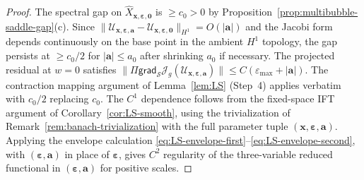 \documentclass[11pt,reqno,a4paper]{amsart}
\numberwithin{equation}{section}
\theoremstyle{plain}
\theoremstyle{remark}
\theoremstyle{plain}
\begin{document}
\begin{proof}
The spectral gap on $\widehat X_{\mathbf x,\boldsymbol\varepsilon,\mathbf 0}$ is $\ge c_0>0$
by Proposition~\ref{prop:multibubble-saddle-gap}\textup{(c)}.
Since
$\|\mathcal U_{\mathbf x,\boldsymbol\varepsilon,\mathbf a}
-\mathcal U_{\mathbf x,\boldsymbol\varepsilon,\mathbf 0}\|_{H^1}
=O(|\mathbf a|)$
and the Jacobi form depends continuously on the base point in the ambient $H^1$ topology,
the gap persists at $\ge c_0/2$ for $|\mathbf a|\le a_0$ after shrinking $a_0$ if necessary.
The projected residual at $w=0$ satisfies
$\|\Pi\mathsf{grad}_{\mathcal S}\mathcal J_g
(\mathcal U_{\mathbf x,\boldsymbol\varepsilon,\mathbf a})\|
\le C(\varepsilon_{\max}+|\mathbf a|)$.
The contraction mapping argument of Lemma~\ref{lem:LS} (Step~4)
applies verbatim with $c_0/2$ replacing $c_0$.
The $C^1$ dependence follows from the fixed-space IFT argument of
Corollary~\ref{cor:LS-smooth}, using the trivialization of
Remark~\ref{rem:banach-trivialization} with the full parameter tuple
$(\mathbf x,\boldsymbol\varepsilon,\mathbf a)$.  Applying the envelope calculation
\eqref{eq:LS-envelope-first}--\eqref{eq:LS-envelope-second}, with
$(\boldsymbol\varepsilon,\mathbf a)$ in place of $\boldsymbol\varepsilon$, gives $C^2$ regularity of the
three-variable reduced functional in $(\boldsymbol\varepsilon,\mathbf a)$ for positive scales.
\end{proof}
\end{document}
